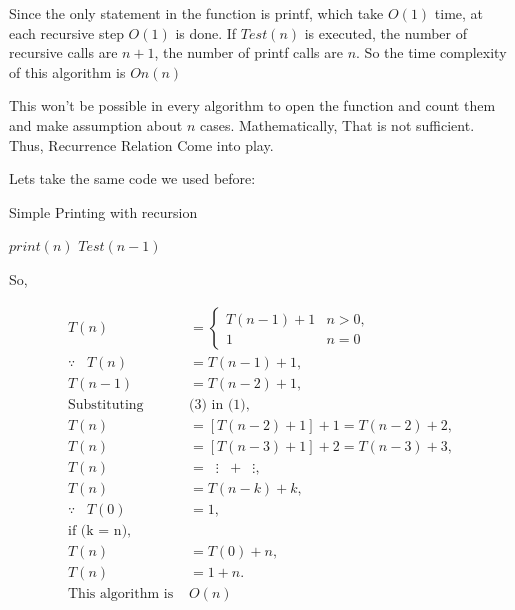 \documentclass[]{article}
\begin{document}
Since the only statement in the function is printf, which take $O(1)$ time, at each recursive step $O(1)$ is done. If $Test(n)$ is executed, the number of recursive calls are $n+1$, the number of printf calls are $n$.
So the time complexity of this algorithm is $On(n)$

This won't be possible in every algorithm to open the function and count them and make assumption about $n$ cases. Mathematically, That is not sufficient. Thus, Recurrence Relation Come into play.

Lets take the same code we used before:

\begin{algorithm}[H]
    \caption{Simple Printing with recursion}
    \label{printRecursion}
    \begin{algorithmic}
         
            \State$print(n)$ 
            \State$Test(n-1)$  
        \EndIf
        \EndProcedure
    \end{algorithmic}
\end{algorithm}

So,

\[
\begin{aligned}
    T(n) &=
    \begin{cases}
        T(n - 1) + 1 \label{base} & n > 0, \\
        1 & n = 0
    \end{cases} \\
    \because \hspace{10pt} T(n) &= T(n - 1) + 1, \\
    T(n - 1) &= T(n - 2) + 1, \\
    \text{Substituting} & \text{(3) in (1)}, \\
    T(n) &= [T(n - 2) + 1] + 1 = T(n - 2) + 2, \\
    T(n) &= [T(n - 3) + 1] + 2 = T(n - 3) + 3, \\
    T(n) &= \hspace{7pt}\vdots \hspace{7pt}+\hspace{7pt} \vdots, \\
    T(n) &= T(n - k) + k, \\
    \because \hspace{10pt} T(0) &= 1, \\
    \text{if (k = n)}, \\
    T(n) &= T(0) + n, \\
    T(n) &= 1 + n.\\
    \text{This algorithm is } & O(n)
\end{aligned}
\]
\end{document}
